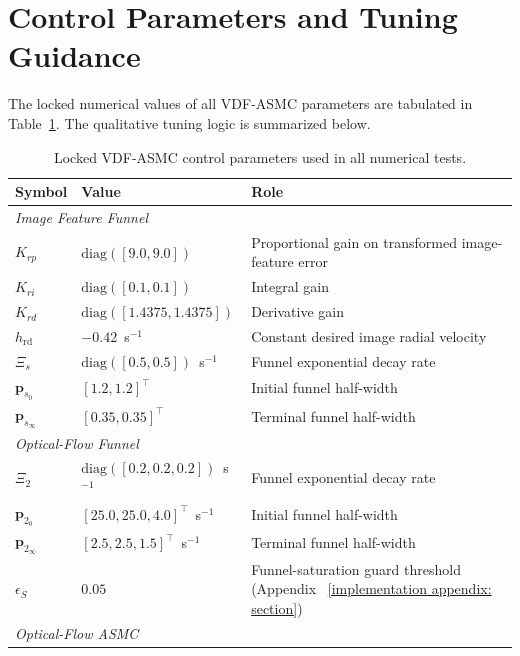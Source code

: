 \documentclass{IEEEtaes}
\begin{document}
\section{Control Parameters and Tuning Guidance} \label{tuning: section}
The locked numerical values of all VDF-ASMC parameters are tabulated in Table~\ref{sup:control params}. The qualitative tuning logic is summarized below.

\begin{table}[!t]
    \centering
    \footnotesize
    \caption{Locked VDF-ASMC control parameters used in all numerical tests.}
    \label{sup:control params}
    \begin{tabular}{p{} p{} p{}}
    \toprule
        \textbf{Symbol} & \textbf{Value} & \textbf{Role}\\
    \midrule
        \multicolumn{3}{l}{\textit{Image Feature Funnel}} \\
        $K_{rp}$ & $\text{diag}([9.0,9.0])$ & Proportional gain on transformed image-feature error \\
        $K_{ri}$ & $\text{diag}([0.1,0.1])$ & Integral gain \\
        $K_{rd}$ & $\text{diag}([1.4375,1.4375])$ & Derivative gain \\
        $h_\text{rd}$ & $-0.42$~s$^{-1}$ & Constant desired image radial velocity \\
        $\Xi_s$                     & $\text{diag}([0.5,0.5])$~s$^{-1}$ & Funnel exponential decay rate \\
        $\boldsymbol{p}_{s_0}$      & $[1.2,1.2]^\top$ & Initial funnel half-width \\
        $\boldsymbol{p}_{s_\infty}$ & $[0.35,0.35]^\top$ & Terminal funnel half-width \\
    \midrule
        \multicolumn{3}{l}{\textit{Optical-Flow Funnel}} \\
        $\Xi_2$                     & $\text{diag}([0.2,0.2,0.2])$~s$^{-1}$ & Funnel exponential decay rate \\
        $\boldsymbol{p}_{2_0}$      & $[25.0,25.0,4.0]^\top$~s$^{-1}$ & Initial funnel half-width \\
        $\boldsymbol{p}_{2_\infty}$ & $[2.5,2.5,1.5]^\top$~s$^{-1}$ & Terminal funnel half-width \\
        $\epsilon_S$                & $0.05$ & Funnel-saturation guard threshold (Appendix~
\ref{implementation appendix: section}) \\
    \midrule
        \multicolumn{3}{l}{\textit{Optical-Flow ASMC}} \\

\end{tabular}
\end{table}
\end{document}
